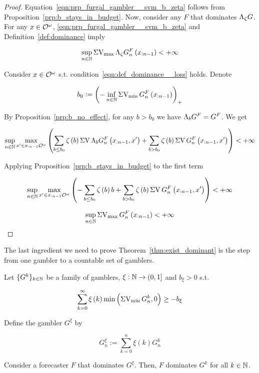 \begin{proof}

Equation~\ref{eqn:prp_furgal_gambler__svm_b_zeta} follows from Proposition~\ref{prp:b_stays_in_budget}. Now, consider any $F$ that dominates $\Lambda_\zeta G$. For any $x \in \mathcal{O}^\omega$, \ref{eqn:prp_furgal_gambler__svm_b_zeta} and Definition~\ref{def:dominance} imply

\[\sup_{n \in \mathbb{N}} {\operatorname{\Sigma V_{\max}} \Lambda_\zeta G^F_{n}\left(x_{:n-1}\right)} < +\infty\]

Consider $x \in \mathcal{O}^\omega$ s.t. condition~\ref{eqn:def_dominance__loss} holds. Denote

\[b_0: = \left( -\inf_{n \in \mathbb{N}} {\operatorname{\Sigma V_{\min}} G^F_{n}\left(x_{:n-1}\right)}\right)_+\]

By Proposition~\ref{prp:b_no_effect}, for any $b > b_0$ we have $\Lambda_b G^F = G^F$. We get

\[\sup_{n \in \mathbb{N}} \max_{x' \in x_{:n-1}\mathcal{O}^\omega} \left(\sum_{b \leq b_0} \zeta\left(b\right) {\operatorname{\Sigma V} \Lambda_b G^F_{n}\left(x_{:n-1},x'\right)} + \sum_{b > b_0} \zeta\left(b\right) \operatorname{\Sigma V} G^F_{n}\left(x_{:n-1},x'\right)\right) < +\infty\]

Applying Proposition~\ref{prp:b_stays_in_budget} to the first term

\[\sup_{n \in \mathbb{N}} \max_{x' \in x_{:n-1}\mathcal{O}^\omega} \left(-\sum_{b \leq b_0} \zeta\left(b\right) b + \sum_{b > b_0} \zeta\left(b\right) \operatorname{\Sigma V} G^F_{n}\left(x_{:n-1},x'\right)\right) < +\infty\]

\[\sup_{n \in \mathbb{N}} \operatorname{\Sigma V_{\max}} G^F_{n}\left(x_{:n-1}\right) < +\infty\]
\end{proof}

The last ingredient we need to prove Theorem~\ref{thm:exist_dominant} is the step from one gambler to a countable set of gamblers.

\begin{proposition}
\label{prp:combining_gamblers}

Let $\{G^k\}_{k \in \mathbb{N}}$ be a family of gamblers, $\xi: \mathbb{N} \rightarrow (0,1]$ and $b_\xi > 0$ s.t.

\begin{equation}
\label{eqn:prp_combining_gamblers__budget}
\sum_{k = 0}^\infty \xi\left(k\right) \min\left(\operatorname{\Sigma V_{\min}} G^k_n,0\right) \geq -b_\xi
\end{equation}

Define the gambler $G^\xi$ by

\begin{equation}
G^\xi_n := \sum_{k = 0}^n \xi\left(k\right) G^k_n
\end{equation}

Consider a forecaster $F$ that dominates $G^\xi$. Then, $F$ dominates $G^k$ for all $k \in \mathbb{N}$.

\end{proposition}

